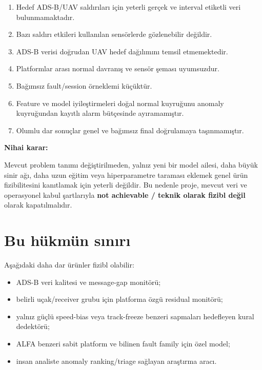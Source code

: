 \documentclass[11pt,a4paper,oneside]{report}
\begin{document}
\begin{enumerate}
  \item Hedef ADS-B/UAV saldırıları için yeterli gerçek ve interval etiketli
  veri bulunmamaktadır.
  \item Bazı saldırı etkileri kullanılan sensörlerde gözlenebilir değildir.
  \item ADS-B verisi doğrudan UAV hedef dağılımını temsil etmemektedir.
  \item Platformlar arası normal davranış ve sensör şeması uyumsuzdur.
  \item Bağımsız fault/session örneklemi küçüktür.
  \item Feature ve model iyileştirmeleri doğal normal kuyruğunu anomaly
  kuyruğundan kayıtlı alarm bütçesinde ayıramamıştır.
  \item Olumlu dar sonuçlar genel ve bağımsız final doğrulamaya taşınmamıştır.
\end{enumerate}

\begin{verdictbox}
\textbf{Nihai karar:}

Mevcut problem tanımı değiştirilmeden, yalnız yeni bir model ailesi,
daha büyük sinir ağı, daha uzun eğitim veya hiperparametre taraması eklemek
genel ürün fizibilitesini kanıtlamak için yeterli değildir. Bu nedenle
proje, mevcut veri ve operasyonel kabul şartlarıyla
\textbf{not achievable / teknik olarak fizibl değil} olarak
kapatılmalıdır.
\end{verdictbox}

\section{Bu hükmün sınırı}

Aşağıdaki daha dar ürünler fizibl olabilir:

\begin{itemize}
  \item ADS-B veri kalitesi ve message-gap monitörü;
  \item belirli uçak/receiver grubu için platforma özgü residual monitörü;
  \item yalnız güçlü speed-bias veya track-freeze benzeri sapmaları hedefleyen
  kural dedektörü;
  \item ALFA benzeri sabit platform ve bilinen fault family için özel model;
  \item insan analiste anomaly ranking/triage sağlayan araştırma aracı.
\end{itemize}
\end{document}
